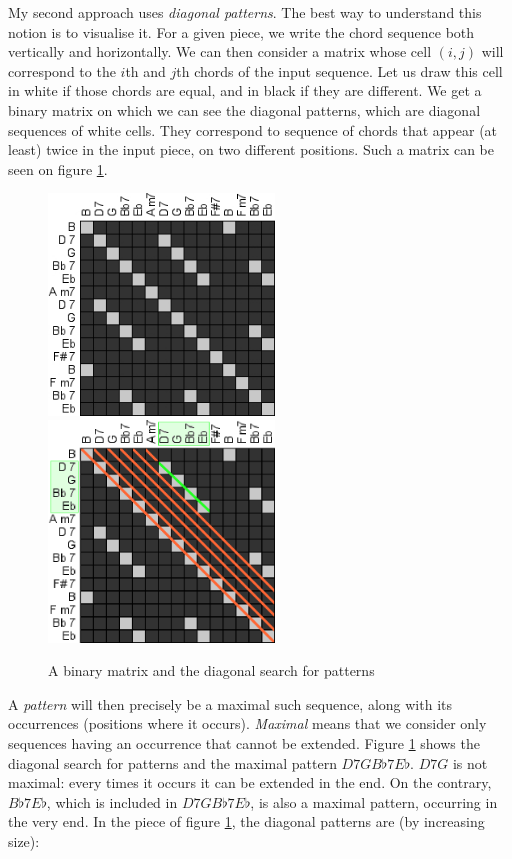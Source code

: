 \documentclass[a4paper,10pt]{article}
\begin{document}
My second approach uses \emph{diagonal patterns}. The best way to understand this notion is to visualise it. For a given piece, we write the chord sequence both vertically and horizontally. We can then consider a matrix whose cell $(i,j)$ will correspond to the $i$th and $j$th chords of the input sequence. Let us draw this cell in white if those chords are equal, and in black if they are different. We get a binary matrix on which  we can see the diagonal patterns, which are diagonal sequences of white cells. They correspond to sequence of chords that appear (at least) twice in the input piece, on two different positions. Such a matrix can be seen on figure \ref{diagonals}.

\begin{figure}[h]
\centering
\includegraphics[width=6cm]{images/diagonals1.jpg}\hspace{1cm}
\includegraphics[width=6cm]{images/diagonals2.jpg}
\caption{A binary matrix and the diagonal search for patterns\label{diagonals}}
\end{figure}

A \emph{pattern} will then precisely be a maximal such sequence, along with its occurrences (positions where it occurs). \emph{Maximal} means that we consider only sequences having an occurrence that cannot be extended. Figure \ref{diagonals} shows the diagonal search for patterns and the maximal pattern $D7GB\flat 7E\flat$. $D7G$ is not maximal: every times it occurs it can be extended in the end. On the contrary, $B\flat 7E\flat$, which is included in $D7GB\flat 7E\flat$, is also a maximal pattern, occurring in the very end. In the piece of figure \ref{diagonals}, the diagonal patterns are (by increasing size):
\end{document}
